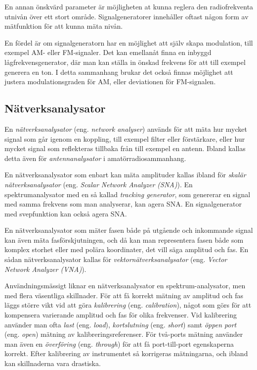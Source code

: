 En annan önskvärd parameter är möjligheten at kunna reglera den radiofrekventa
utnivån över ett stort område.
Signalgeneratorer innehåller oftast någon form av mätfunktion för att kunna
mäta nivån.

En fördel är om signalgeneratorn har en möjlighet att själv skapa modulation,
till exempel AM- eller FM-signaler.
Det kan emellanåt finna en inbyggd lågfrekvensgenerator, där man kan ställa in
önskad frekvens för att till exempel generera en ton.
I detta sammanhang brukar det också finnas möjlighet att justera
modulationsgraden för AM, eller deviationen för FM-signalen.

\subsection{Nätverksanalysator}
\label{nätverksanalysator}
\label{network analyzer}
\label{antennanalysator}
\label{skalär nätverksanalysator}
\label{Scalar Network Analyzer (SNA)}
\label{SNA}
\label{tracking generator}
\label{vektornätverksanalysator}
\label{Vector Network Analyzer (VNA)}
\label{VNA}

En \emph{nätverksanalysator} (eng. \emph{network analyser}) används för att
mäta hur mycket signal som går igenom en koppling, till exempel filter eller
förstärkare, eller hur mycket signal som reflekteras tillbaka från till exempel en
antenn.
Ibland kallas detta även för \emph{antennanalysator} i amatörradiosammanhang.

En nätverksanalysator som enbart kan mäta amplituder kallas ibland för
\emph{skalär nätverksanalysator} (eng. \emph{Scalar Network Analyzer (SNA)}).
En spektrumanalysator med en så kallad \emph{tracking generator}, som genererar
en signal med samma frekvens som man analyserar, kan agera SNA.
En signalgenerator med svepfunktion kan också agera SNA.

En nätverksanalysator som mäter fasen både på utgående och inkommande signal
kan även mäta fasförskjutningen, och då kan man representera fasen både som
komplex storhet eller med polära koordinater, det vill säga amplitud och fas.
En sådan nätverksanalysator kallas för \emph{vektornätverksanalysator} (eng.
\emph{Vector Network Analyzer (VNA)}).

Användningsmässigt liknar en nätverksanalysator en spektrum-analysator, men
med flera väsentliga skillnader.
För att få korrekt mätning av amplitud och fas läggs större vikt vid att göra
\emph{kalibrering} (eng. \emph{calibration}), något som görs för att kompensera
varierande amplitud och fas för olika frekvenser.
Vid kalibrering använder man ofta \emph{last} (eng. \emph{load}),
\emph{kortslutning} (eng. \emph{short}) samt \emph{öppen port} (eng.
\emph{open}) mätning av kalibreringsreferenser.
För två-ports mätning använder man även en \emph{överföring} (eng.
\emph{through}) för att få port-till-port egenskaperna korrekt.
Efter kalibrering av instrumentet så korrigeras mätningarna, och ibland kan
skillnaderna vara drastiska.

